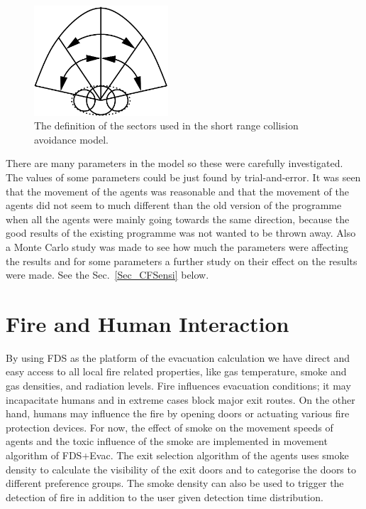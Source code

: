 \documentclass[12pt,a4paper,final,twoside]{stylevk}
\begin{document}
%
\begin{figure}[!tb]
  \centerline{ \includegraphics[clip=true, width=50mm]{FIGURES/CF_Sectors}} 
  \caption{The definition of the sectors used in the short range
    collision avoidance model.}\label{Fig_CFsectors}
\end{figure}


There are many parameters in the model so these were carefully
investigated.  The values of some parameters could be just found by
trial-and-error.  It was seen that the movement of the agents was
reasonable and that the movement of the agents did not seem to much
different than the old version of the programme when all the agents
were mainly going towards the same direction, because the good results
of the existing programme was not wanted to be thrown away.  Also a
Monte Carlo study was made to see how much the parameters were
affecting the results and for some parameters a further study on their
effect on the results were made.  See the Sec.~\ref{Sec_CFSensi}
below.


\section{Fire and Human Interaction}\label{Sec_FireHumanInt}

\noindent By using FDS as the platform of the evacuation calculation
we have direct and easy access to all local fire related properties,
like gas temperature, smoke and gas densities, and radiation levels.
Fire influences evacuation conditions; it may incapacitate humans and
in extreme cases block major exit routes.  On the other hand, humans
may influence the fire by opening doors or actuating various fire
protection devices.  For now, the effect of smoke on the movement
speeds of agents and the toxic influence of the smoke are implemented
in movement algorithm of FDS+Evac.  The exit selection algorithm of
the agents uses smoke density to calculate the visibility of the exit
doors and to categorise the doors to different preference groups.
The smoke density can also be used to trigger the detection of fire in
addition to the user given detection time distribution.
\end{document}
